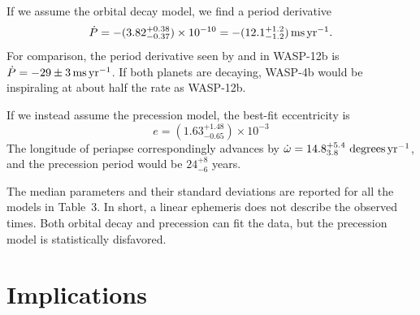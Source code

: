 \documentclass[12pt,twocolumn,tighten]{aastex62}
\begin{document}
If we assume the orbital decay model, we find a period derivative 
\begin{equation}
\dot{P}
    = - (3.82^{+0.38}_{-0.37})\times 10^{-10}
    = - (12.1^{+1.2}_{-1.2})\,{\rm ms}\,{\rm yr}^{-1}.
    \label{eq:dP_dt_obs}
\end{equation}
For comparison, the period derivative seen by
\citet{maciejewski_departure_2016} and \citet{patra_2017} in WASP-12b is
$\dot{P} = -29 \pm 3\,{\rm ms}\,{\rm yr}^{-1}$.
If both planets are decaying, WASP-4b would be inspiraling at about half
the rate as WASP-12b.

If we instead assume the precession model, the best-fit
eccentricity is
\begin{equation}
e = (1.63^{+ 1.48}_{- 0.65})\times10^{-3}
\end{equation}
The longitude of periapse correspondingly advances by $\dot{\omega}
= 14.8^{+5.4}_{3.8}\ {\rm degrees}\,{\rm yr}^{-1}$, and the
precession period would be $24^{+8}_{-6}$ years.

The median parameters and their standard deviations are reported for all
the models in Table~3.  In short, a linear ephemeris does not
describe the observed times.  Both orbital decay and precession can fit
the data, but the precession model is statistically disfavored.


\section{Implications}
\label{sec:implications}
\end{document}
